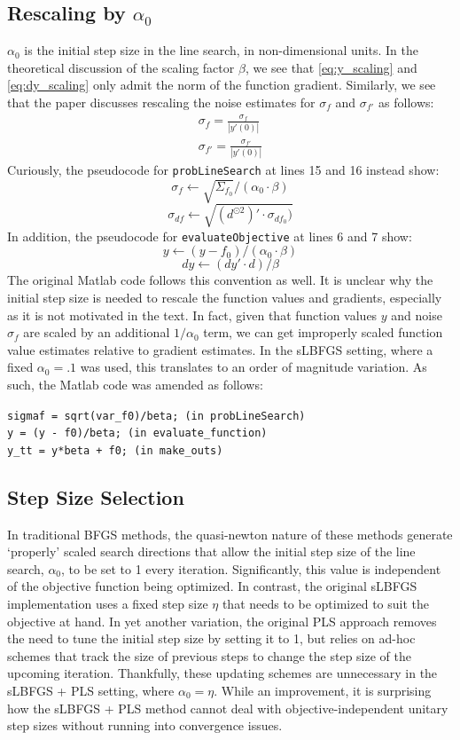 \documentclass{article}
\begin{document}
\subsection{Rescaling by $\alpha_0$}
$\alpha_0$ is the initial step size in the line search, in non-dimensional units. In the theoretical discussion of the scaling factor $\beta$, we see that \eqref{eq:y_scaling} and \eqref{eq:dy_scaling} only admit the norm of the function gradient. Similarly, we see that the paper discusses rescaling the noise estimates for $\sigma_f$ and $\sigma_{f'}$ as follows:
\begin{gather}
\label{eq:sy_scaling} \sigma_f = \frac{\sigma_f}{|y'(0)|} \\
\label{eq:sdy_scaling} \sigma_{f'} = \frac{\sigma_{f'}}{|y'(0)|}
\end{gather}
Curiously, the pseudocode for \texttt{probLineSearch} at lines 15 and 16 instead show:
\[ \sigma_f \leftarrow \sqrt{\Sigma_{f_0}}/(\alpha_0\cdot\beta) \]
\[ \sigma_{df} \leftarrow \sqrt{(d^{\odot 2})'\cdot \sigma_{df_0})} \]
In addition, the pseudocode for \texttt{evaluateObjective} at lines 6 and 7 show:
\[ y \leftarrow (y-f_0)/(\alpha_0\cdot\beta) \]
\[ dy \leftarrow (dy' \cdot d)/\beta \]
The original Matlab code follows this convention as well. It is unclear why the initial step size is needed to rescale the function values and gradients, especially as it is not motivated in the text. In fact, given that function values $y$ and noise $\sigma_f$ are scaled by an additional $1/\alpha_0$ term, we can get improperly scaled function value estimates relative to gradient estimates. In the sLBFGS setting, where a fixed $\alpha_0=.1$ was used, this translates to an order of magnitude variation. As such, the Matlab code was amended as follows:
\begin{center}
\texttt{sigmaf  = sqrt(var_f0)/beta; (in probLineSearch)}\\
\texttt{y = (y - f0)/beta; (in evaluate_function)} \\
\texttt{y_tt = y*beta + f0; (in make_outs)}
\end{center}
\subsection{Step Size Selection}
In traditional BFGS methods, the quasi-newton nature of these methods generate `properly' scaled search directions that allow the initial step size of the line search, $\alpha_0$, to be set to 1 every iteration. Significantly, this value is independent of the objective function being optimized. In contrast, the original sLBFGS implementation uses a fixed step size $\eta$ that needs to be optimized to suit the objective at hand. In yet another variation, the original PLS approach removes the need to tune the initial step size by setting it to 1, but relies on ad-hoc schemes that track the size of previous steps to change the step size of the upcoming iteration. Thankfully, these updating schemes are unnecessary in the sLBFGS + PLS setting, where $\alpha_0 = \eta$. While an improvement, it is surprising how the sLBFGS + PLS method cannot deal with objective-independent unitary step sizes without running into convergence issues. 
\end{document}
